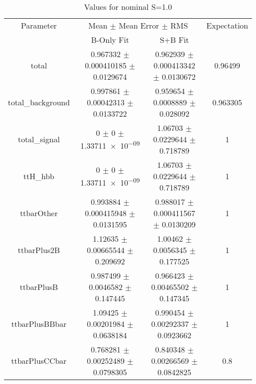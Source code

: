 \begin{table}
\centering
\caption{Values for nominal S=1.0}
\begin{tabular}{cccc}
\toprule
Parameter & \multicolumn{2}{c}{Mean $\pm$ Mean Error $\pm$ RMS} & Expectation\\
 & B-Only Fit & S+B Fit & \\
\midrule
total & \num{0.967332} $\pm$ \num{0.000410185} $\pm$ \num{0.0129674} & \num{0.962939} $\pm$ \num{0.000413342} $\pm$ \num{0.0130672} & \num{0.96499}\\
total\_background & \num{0.997861} $\pm$ \num{0.00042313} $\pm$ \num{0.0133722} & \num{0.959654} $\pm$ \num{0.0008889} $\pm$ \num{0.028092} & \num{0.963305}\\
total\_signal & \num{0} $\pm$ \num{0} $\pm$ \num{1.33711e-09} & \num{1.06703} $\pm$ \num{0.0229644} $\pm$ \num{0.718789} & \num{1}\\
ttH\_hbb & \num{0} $\pm$ \num{0} $\pm$ \num{1.33711e-09} & \num{1.06703} $\pm$ \num{0.0229644} $\pm$ \num{0.718789} & \num{1}\\
ttbarOther & \num{0.993884} $\pm$ \num{0.000415948} $\pm$ \num{0.0131595} & \num{0.988017} $\pm$ \num{0.000411567} $\pm$ \num{0.0130209} & \num{1}\\
ttbarPlus2B & \num{1.12635} $\pm$ \num{0.00665544} $\pm$ \num{0.209692} & \num{1.00462} $\pm$ \num{0.0056345} $\pm$ \num{0.177525} & \num{1}\\
ttbarPlusB & \num{0.987499} $\pm$ \num{0.0046582} $\pm$ \num{0.147445} & \num{0.966423} $\pm$ \num{0.00465502} $\pm$ \num{0.147345} & \num{1}\\
ttbarPlusBBbar & \num{1.09425} $\pm$ \num{0.00201984} $\pm$ \num{0.0638184} & \num{0.990454} $\pm$ \num{0.00292337} $\pm$ \num{0.0923662} & \num{1}\\
ttbarPlusCCbar & \num{0.768281} $\pm$ \num{0.00252489} $\pm$ \num{0.0798305} & \num{0.840348} $\pm$ \num{0.00266569} $\pm$ \num{0.0842825} & \num{0.8}\\
\bottomrule
\end{tabular}
\end{table}